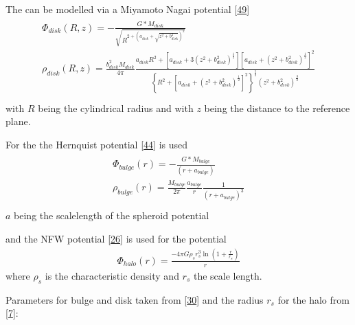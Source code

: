 \documentclass[letterpaper,10pt,english]{sphinxmanual}
\begin{document}
			\sphinxAtStartPar
			The  can be modelled via a Miyamoto Nagai potential {[}\hyperlink{cite.NBodySimulation/Appendix:id3}{49}{]}
			\begin{align*}\!\begin{aligned}
			\Phi_{disk}\left ( R,z \right ) = -\frac{G*M_{disk}}{\sqrt{R^{2+\left ( a_{disk}+\sqrt{z^{2}+b_{disk}^{2}} \right )^{2}}}}\\
			\rho_{disk}(R,z)=\frac{b_{disk}^{2}M_{disk}}{4\pi}\frac{a_{disk}R^{2}+\left[a_{disk}+3(z^{2}+b_{disk}^{2})^{\frac{1}{2}}\right]\left[a_{disk}+(z^{2}+b_{disk}^{2})^{\frac{1}{2}}\right]^{2}}{\left \{ R^{2}+\left[a_{disk}+(z^{2}+b_{disk}^{2})^{\frac{1}{2}}\right]^{2} \right \}^{\frac{5}{2}}\left(z^{2}+b_{disk}^{2}\right)^{\frac{3}{2}}}\\
			\end{aligned}\end{align*}
			\sphinxAtStartPar
			with \(R\) being the cylindrical radius and with \(z\) being the distance to the reference plane.
			
			\sphinxAtStartPar
			For the  the Hernquist potential {[}\hyperlink{cite.NBodySimulation/Appendix:id6}{44}{]} is used
			\begin{align*}\!\begin{aligned}
			\Phi_{bulge}\left ( r \right ) = -\frac{G*M_{bulge}}{\left ( r+a_{bulge} \right )}\\
			\rho_{bulge}(r)= \frac{M_{bulge}}{2\pi }\frac{a_{bulge}}{r}\frac{1}{\left ( r+a_{bulge} \right )^{3}}\\
			\end{aligned}\end{align*}
			\sphinxAtStartPar
			\(a\) being the scale\sphinxhyphen{}length of the spheroid potential
			
			\sphinxAtStartPar
			and the NFW potential {[}\hyperlink{cite.NBodySimulation/Appendix:id59}{26}{]} is used for the  potential
			\begin{equation*}
			\begin{split}\Phi_{halo}\left ( r \right ) = \frac{-4\pi G\rho _{s}r_{s}^{3}\ln\left ( 1+\frac{r}{r_{s}}\right )}{r}\end{split}
			\end{equation*}
			\sphinxAtStartPar
			where \(\rho _{s}\) is the characteristic density and \(r_{s}\) the scale length.
			
			\sphinxAtStartPar
			Parameters for bulge and disk taken from {[}\hyperlink{cite.NBodySimulation/Appendix:id4}{30}{]} and the radius \(r_{s}\) for the halo from {[}\hyperlink{cite.NBodySimulation/Appendix:id5}{7}{]}:
			
\end{document}
